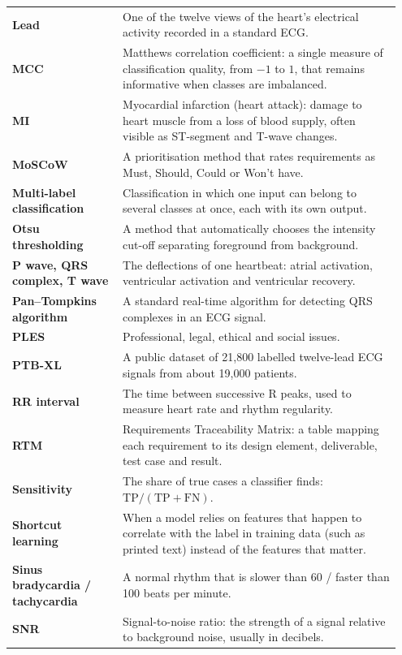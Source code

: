 \documentclass[12pt,nonacm,acmlarge,titlepage,screen]{acmart}
\begin{document}
\begin{longtable}{@{}>{\raggedright\arraybackslash}P{0.27\linewidth} P{0.68\linewidth}@{}}
  \textbf{Lead} & One of the twelve views of the heart's electrical activity recorded in a standard ECG. \\
  \textbf{MCC} & Matthews correlation coefficient: a single measure of classification quality, from $-1$ to $1$, that remains informative when classes are imbalanced. \\
  \textbf{MI} & Myocardial infarction (heart attack): damage to heart muscle from a loss of blood supply, often visible as ST-segment and T-wave changes. \\
  \textbf{MoSCoW} & A prioritisation method that rates requirements as Must, Should, Could or Won't have. \\
  \textbf{Multi-label classification} & Classification in which one input can belong to several classes at once, each with its own output. \\
  \textbf{Otsu thresholding} & A method that automatically chooses the intensity cut-off separating foreground from background. \\
  \textbf{P wave, QRS complex, T wave }& The deflections of one heartbeat: atrial activation, ventricular activation and ventricular recovery. \\
  \textbf{Pan--Tompkins algorithm} & A standard real-time algorithm for detecting QRS complexes in an ECG signal. \\
  \textbf{PLES} & Professional, legal, ethical and social issues. \\
  \textbf{PTB-XL} & A public dataset of 21,800 labelled twelve-lead ECG signals from about 19,000 patients. \\
  \textbf{RR interval} & The time between successive R peaks, used to measure heart rate and rhythm regularity. \\
  \textbf{RTM} & Requirements Traceability Matrix: a table mapping each requirement to its design element, deliverable, test case and result. \\
  \textbf{Sensitivity} & The share of true cases a classifier finds: $\mathrm{TP}/(\mathrm{TP}+\mathrm{FN})$. \\
  \textbf{Shortcut learning} & When a model relies on features that happen to correlate with the label in training data (such as printed text) instead of the features that matter. \\
  \textbf{Sinus bradycardia / tachycardia} & A normal rhythm that is slower than 60 / faster than 100 beats per minute. \\
  \textbf{SNR} & Signal-to-noise ratio: the strength of a signal relative to background noise, usually in decibels. \\

\end{longtable}
\end{document}
